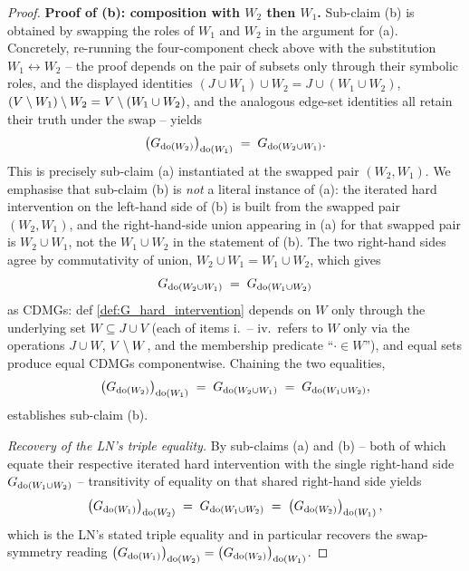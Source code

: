 \begin{proof}
\medskip\noindent\textbf{Proof of (b): composition with $W_2$ then $W_1$.}
Sub-claim (b) is obtained by swapping the roles of $W_1$ and $W_2$ in the argument for (a). Concretely, re-running the four-component check above with the substitution $W_1 \leftrightarrow W_2$ -- the proof depends on the pair of subsets only through their symbolic roles, and the displayed identities $(J \cup W_1) \cup W_2 = J \cup (W_1 \cup W_2)$, $(V \setminus W_1) \setminus W_2 = V \setminus (W_1 \cup W_2)$, and the analogous edge-set identities all retain their truth under the swap -- yields
\[
    \left ( G_{\operatorname{do}(W_2)} \right )_{\operatorname{do}(W_1)} \;=\; G_{\operatorname{do}(W_2 \cup W_1)}.
\]
This is precisely sub-claim (a) instantiated at the swapped pair $(W_2, W_1)$. We emphasise that sub-claim (b) is \emph{not} a literal instance of (a): the iterated hard intervention on the left-hand side of (b) is built from the swapped pair $(W_2, W_1)$, and the right-hand-side union appearing in (a) for that swapped pair is $W_2 \cup W_1$, not the $W_1 \cup W_2$ in the statement of (b). The two right-hand sides agree by commutativity of union, $W_2 \cup W_1 = W_1 \cup W_2$, which gives
\[
    G_{\operatorname{do}(W_2 \cup W_1)} \;=\; G_{\operatorname{do}(W_1 \cup W_2)}
\]
as CDMGs: def \ref{def:G_hard_intervention} depends on $W$ only through the underlying set $W \subseteq J \cup V$ (each of items i.\ -- iv.\ refers to $W$ only via the operations $J \cup W$, $V \setminus W$, and the membership predicate ``$\cdot \in W$''), and equal sets produce equal CDMGs componentwise. Chaining the two equalities,
\[
    \left ( G_{\operatorname{do}(W_2)} \right )_{\operatorname{do}(W_1)} \;=\; G_{\operatorname{do}(W_2 \cup W_1)} \;=\; G_{\operatorname{do}(W_1 \cup W_2)},
\]
establishes sub-claim (b).

\medskip\noindent\emph{Recovery of the LN's triple equality.}
By sub-claims (a) and (b) -- both of which equate their respective iterated hard intervention with the single right-hand side $G_{\operatorname{do}(W_1 \cup W_2)}$ -- transitivity of equality on that shared right-hand side yields
\[
    \left ( G_{\operatorname{do}(W_1)} \right )_{\operatorname{do}(W_2)} \;=\; G_{\operatorname{do}(W_1 \cup W_2)} \;=\; \left ( G_{\operatorname{do}(W_2)} \right )_{\operatorname{do}(W_1)},
\]
which is the LN's stated triple equality and in particular recovers the swap-symmetry reading $\left ( G_{\operatorname{do}(W_1)} \right )_{\operatorname{do}(W_2)} = \left ( G_{\operatorname{do}(W_2)} \right )_{\operatorname{do}(W_1)}$.
\end{proof}


